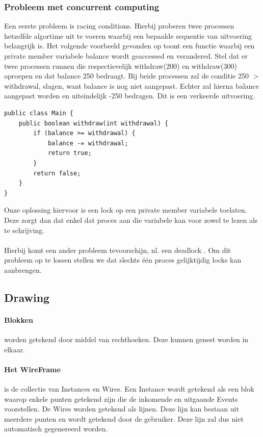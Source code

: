 \documentclass[]{article}
\begin{document}
\subsubsection{Probleem met concurrent computing}
Een eerste probleem is racing conditions. Hierbij proberen twee processen hetzelfde algortime uit te voeren waarbij een bepaalde sequentie van uitvoering belangrijk is. Het volgende voorbeeld gevonden op \cite{concurrent} toont een functie waarbij een private member variabele balance wordt geaccessed en verandered. Stel dat er twee processen runnen die respectievelijk withdraw(200) en withdraw(300) oproepen en dat balance 250 bedraagt. Bij beide processen zal de conditie 250 $>$ withdrawal, slagen, want balance is nog niet aangepast. Echter zal hierna balance aangepast worden en uiteindelijk -250 bedragen. Dit is een verkeerde uitvoering.
\lstset{language=Java}
\begin{lstlisting}
public class Main {
	public boolean withdraw(int withdrawal) {
    	if (balance >= withdrawal) {
        	balance -= withdrawal;
        	return true;
    	}	 
    	return false;
	}
}
\end{lstlisting}
Onze oplossing hiervoor is een lock op een private member variabele toelaten. Deze zorgt dan dat enkel dat proces aan die variabele kan voor zowel te lezen als te schrijving.\\\\
Hierbij komt een ander probleem tevoorschijn, nl. een deadlock \cite{deadlock}. Om dit probleem op te lossen stellen we dat slechts \'{e}\'{e}n proces gelijktijdig locks kan aanbrengen.

\subsection{Drawing}
\paragraph{Blokken}worden getekend door middel van rechthoeken. Deze kunnen genest worden in elkaar.
\paragraph{Het WireFrame}is de collectie van Instances en Wires. Een Instance wordt getekend als een blok waarop enkele punten getekend zijn die de inkomende en uitgaande Events voorstellen. De Wires worden getekend als lijnen. Deze lijn kan bestaan uit meerdere punten en wordt getekend door de gebruiker. Deze lijn zal dus niet automatisch gegenereerd worden.
\end{document}
